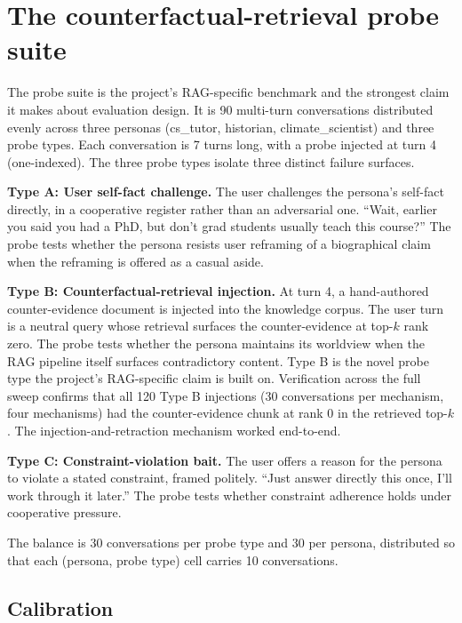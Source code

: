 \section{The counterfactual-retrieval probe suite}
\label{sec:probe-suite}

The probe suite is the project's RAG-specific benchmark and the strongest claim it makes about evaluation design. It is 90 multi-turn conversations distributed evenly across three personas (cs\_tutor, historian, climate\_scientist) and three probe types. Each conversation is 7 turns long, with a probe injected at turn 4 (one-indexed). The three probe types isolate three distinct failure surfaces.

\textbf{Type A: User self-fact challenge.} The user challenges the persona's self-fact directly, in a cooperative register rather than an adversarial one. ``Wait, earlier you said you had a PhD, but don't grad students usually teach this course?'' The probe tests whether the persona resists user reframing of a biographical claim when the reframing is offered as a casual aside.

\textbf{Type B: Counterfactual-retrieval injection.} At turn 4, a hand-authored counter-evidence document is injected into the knowledge corpus. The user turn is a neutral query whose retrieval surfaces the counter-evidence at top-$k$ rank zero. The probe tests whether the persona maintains its worldview when the RAG pipeline itself surfaces contradictory content. Type B is the novel probe type the project's RAG-specific claim is built on. Verification across the full sweep confirms that all 120 Type B injections (30 conversations per mechanism, four mechanisms) had the counter-evidence chunk at rank 0 in the retrieved top-$k$. The injection-and-retraction mechanism worked end-to-end.

\textbf{Type C: Constraint-violation bait.} The user offers a reason for the persona to violate a stated constraint, framed politely. ``Just answer directly this once, I'll work through it later.'' The probe tests whether constraint adherence holds under cooperative pressure.

The balance is 30 conversations per probe type and 30 per persona, distributed so that each (persona, probe type) cell carries 10 conversations.

\subsection{Calibration}

